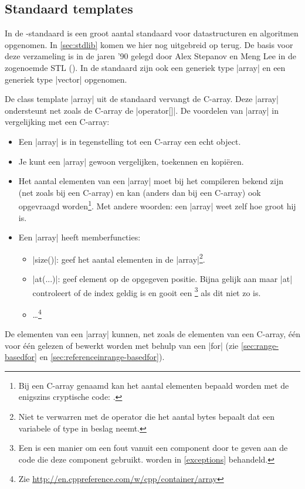\begin{cpplstShortInline}
\section{Standaard templates}
\label{STL}
In de \Cpp{}-standaard \cite{ISO2014} is een groot aantal standaard  voor datastructuren en algoritmen opgenomen. 
In \cref{sec:stdlib} komen we hier nog uitgebreid op terug.
De basis voor deze verzameling  is in de jaren '90 gelegd door Alex Stepanov en Meng Lee in de zogenoemde STL ().
In de standaard  zijn ook een generiek type |array| en een generiek type |vector| opgenomen.

\label{std::array}
De class template |array| uit de standaard \Cpp{}  vervangt de C\hyp{}array.
Deze |array| ondersteunt net zoals de C\hyp{}array de |operator[]|.
De voordelen van |array| in vergelijking met een C\hyp{}array:
\begin{itemize}
    \item Een |array| is in tegenstelling tot een C\hyp{}array een echt object.
    \item Je kunt een |array| gewoon vergelijken, toekennen en kopiëren.
    \item Het aantal elementen van een |array| moet bij het compileren bekend zijn (net zoals bij een C\hyp{}array) en kan (anders dan bij een C\hyp{}array) ook opgevraagd worden\footnote{%
    	Bij een C\hyp{}array genaamd  kan het aantal elementen bepaald worden met de enigszins cryptische code: .
	}. 
    Met andere woorden: een |array| weet zelf hoe groot hij is.
    \item Een |array| heeft memberfuncties:
    \begin{itemize}
        \item |size()|: geef het aantal elementen in de |array|\footnote{%
        	Niet te verwarren met de  operator die het aantal bytes bepaalt dat een variabele of type in beslag neemt. 
    	}.
        \item |at(...)|: geef element op de opgegeven positie.
        Bijna gelijk aan  maar |at| controleert of de index geldig is en gooit een %
        \footnote{%
            Een  is een manier om een fout vanuit een component door te geven aan de code die deze component gebruikt.
             worden in \cref{exceptions} behandeld.%
        } als dit niet zo is.
        \item \ldots\footnote{Zie \url{http://en.cppreference.com/w/cpp/container/array}}
    \end{itemize}
\end{itemize}
De elementen van een |array| kunnen, net zoals de elementen van een C\hyp{}array, één voor één gelezen of bewerkt worden met behulp van een  |for| (zie \cref{sec:range-basedfor} en \cref{sec:referenceinrange-basedfor}).


\end{cpplstShortInline}

